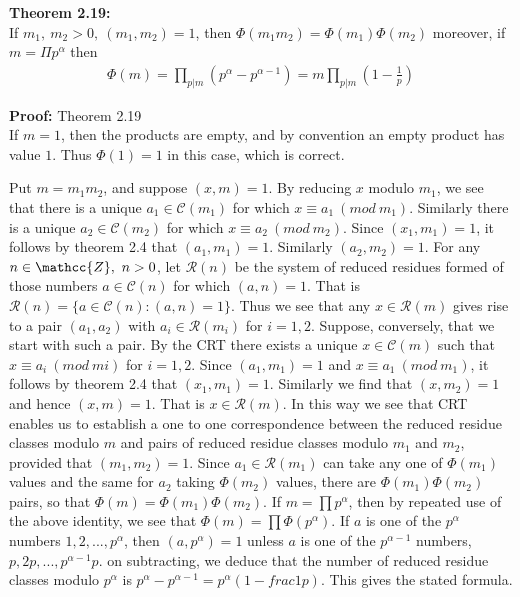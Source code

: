 \documentclass[a4paper]{article}
\begin{document}
\textbf{Theorem 2.19:}\\
If $m_1,\ m_2>0,\ (m_1,m_2)=1$, then $\Phi(m_1m_2)=\Phi(m_1)\Phi(m_2)$ moreover, if $m=\Pi p^\alpha$ then
\begin{align}
    \Phi(m)=\prod_{p|m}(p^\alpha-p^{\alpha-1})=m\prod_{p|m}(1-\frac{1}{p})
\end{align}

\textbf{Proof:} Theorem 2.19\\
If $m=1$, then the products are empty, and by convention an empty product has value $1$. Thus $\Phi(1)=1$ in this case, which is correct.

Put $m=m_1m_2$, and suppose $(x,m)=1$. By reducing $x$ modulo $m_1$, we see that there is a unique $a_1\in\mathcal{C}(m_1)$ for which $x \equiv a_1 \ (mod\ m_1)$. Similarly there is a unique $a_2\in\mathcal{C}(m_2)$ for which $x \equiv a_2 \ (mod\ m_2)$. Since $(x_1,m_1)=1$, it follows by theorem 2.4 that $(a_1,m_1)=1$. Similarly $(a_2,m_2)=1$. For any $n\in\mathcc{Z},\ n>0$, let $\mathcal{R}(n)$ be the system of reduced residues formed of those numbers $a\in\mathcal{C}(n)$ for which $(a,n)=1$. That is $\mathcal{R}(n) = \{a\in\mathcal{C}(n):(a,n)=1\}$. Thus we see that any $x\in\mathcal{R}(m)$ gives rise to a pair $(a_1,a_2)$ with $a_i\in\mathcal{R}(m_i)$ for $i=1,2$.
Suppose, conversely, that we start with such a pair. By the CRT there exists a unique $x\in\mathcal{C}(m)$ such that $x \equiv a_i \ (mod\ mi)$ for $i=1,2$. Since $(a_1,m_1)=1$ and $x \equiv a_1 \ (mod\ m_1)$, it follows by theorem 2.4 that $(x_1,m_1)=1$. Similarly we find that $(x,m_2)=1$ and hence $(x,m)=1$.
That is $x\in\mathcal{R}(m)$. In this way we see that CRT enables us to establish a one to one correspondence between the reduced residue classes modulo $m$ and pairs of reduced residue classes modulo $m_1$ and $m_2$, provided that $(m_1,m_2)=1$.
Since $a_1\in\mathcal{R}(m_1)$ can take any one of $\Phi(m_1)$ values and the same for $a_2$ taking $\Phi(m_2)$ values, there are $\Phi(m_1)\Phi(m_2)$ pairs, so that $\Phi(m)=\Phi(m_1)\Phi(m_2)$. If $m=\prod p^\alpha$, then by repeated use of the above identity, we see that $\Phi(m)=\prod\Phi(p^\alpha)$. If $a$ is one of the $p^\alpha$ numbers $1,2,...,p^\alpha$, then $(a,p^\alpha)=1$ unless $a$ is one of the $p^{\alpha-1}$ numbers, $p,2p,...,p^{\alpha-1}p$.
on subtracting, we deduce that the number of reduced residue classes modulo $p^\alpha$ is $p^\alpha-p^{\alpha-1}=p^\alpha(1-frac{1}{p})$. This gives the stated formula.

\end{document}
